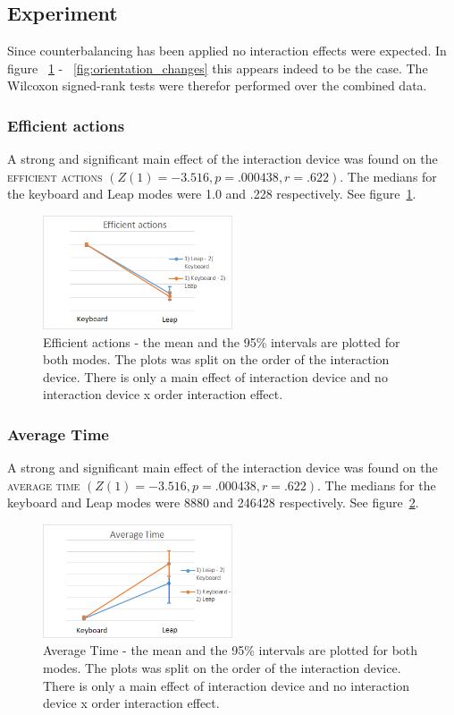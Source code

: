 \subsection{Experiment}
Since counterbalancing has been applied no interaction effects were expected. In figure ~\ref{fig:efficient_actions} - ~\ref{fig:orientation_changes} this appears indeed to be 
the case. The Wilcoxon signed-rank tests were therefor performed over the combined data.

\subsubsection{Efficient actions}
A strong and significant main effect of the interaction device was found on the \textsc{efficient actions} $(Z(1) = -3.516, p = .000438, r = .622)$. The medians for the keyboard 
and Leap modes were 1.0 and .228 respectively. See figure~\ref{fig:efficient_actions}.

\begin{figure}[H]
\centering
\includegraphics[width=0.5\textwidth]{imgs/results/efficient_actions}
\caption{Efficient actions - the mean and the 95\% intervals are plotted for both modes. The plots was split on the order of the interaction device. There is only a main effect 
of interaction device and no interaction device x order interaction effect.}
\label{fig:efficient_actions}
\end{figure}

\subsubsection{Average Time}
A strong and significant main effect of the interaction device was found on the \textsc{average time} $(Z(1) = -3.516, p = .000438, r = .622)$. The medians for the keyboard 
and Leap modes were 8880 and 246428 respectively. See figure~\ref{fig:average_time}.

\begin{figure}[H]
\centering
\includegraphics[width=0.5\textwidth]{imgs/results/average_time}
\caption{Average Time - the mean and the 95\% intervals are plotted for both modes. The plots was split on the order of the interaction device. There is only a main effect 
of interaction device and no interaction device x order interaction effect.}
\label{fig:average_time}
\end{figure}

